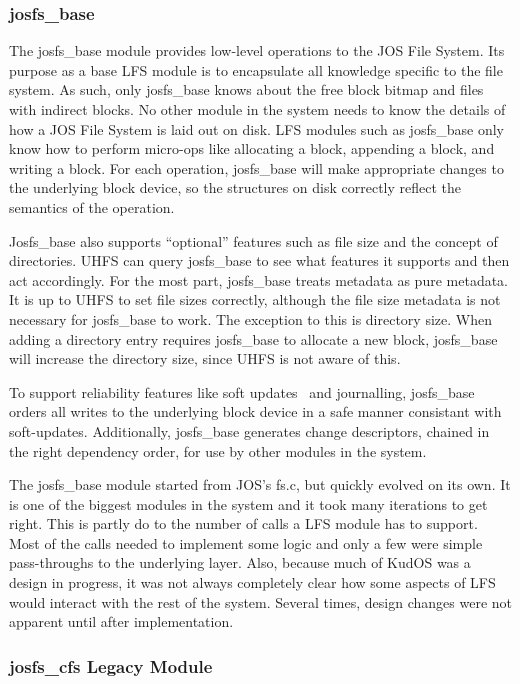 \subsubsection{josfs\_base}
\label{sec:solution:impl:base}

The josfs\_base module provides low-level operations to the JOS File System.
Its purpose as a base LFS module is to encapsulate all knowledge specific to the
file system. As such, only josfs\_base knows about the free block bitmap and
files with indirect blocks. No other module in the system needs to know the
details of how a JOS File System is laid out on disk. LFS modules such as
josfs\_base only know how to perform micro-ops like allocating a block,
appending a block, and writing a block. For each operation, josfs\_base will
make appropriate changes to the underlying block device, so the structures on
disk correctly reflect the semantics of the operation.

Josfs\_base also supports ``optional'' features such as file size and the
concept of directories. UHFS can query josfs\_base to see what features it
supports and then act accordingly. For the most part, josfs\_base treats
metadata as pure metadata. It is up to UHFS to set file sizes correctly,
although the file size metadata is not necessary for josfs\_base to work. The
exception to this is directory size. When adding a directory entry requires
josfs\_base to allocate a new block, josfs\_base will increase the directory
size, since UHFS is not aware of this.

To support reliability features like soft updates~\cite{ganger00soft} and
journalling, josfs\_base orders all writes to the underlying block device in a
safe manner consistant with soft-updates. Additionally, josfs\_base generates
change descriptors, chained in the right dependency order, for use by other
modules in the system.

The josfs\_base module started from JOS's fs.c, but quickly evolved on its own.
It is one of the biggest modules in the system and it took many iterations to
get right. This is partly do to the number of calls a LFS module has to support.
Most of the calls needed to implement some logic and only a few were simple
pass-throughs to the underlying layer. Also, because much of KudOS was a design
in progress, it was not always completely clear how some aspects of LFS would
interact with the rest of the system. Several times, design changes were not
apparent until after implementation.

\subsubsection{josfs\_cfs Legacy Module}
\label{sec:solution:impl:legacy}

